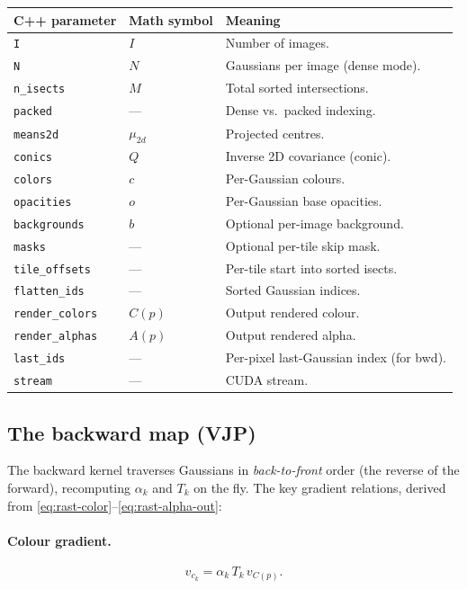 \documentclass[11pt]{article}
\begin{document}
\begin{center}
\begin{tabular}{l l p{7.5cm}}
\hline
\textbf{C++ parameter} & \textbf{Math symbol} & \textbf{Meaning} \\
\hline
\texttt{I} & $I$ & Number of images. \\
\texttt{N} & $N$ & Gaussians per image (dense mode). \\
\texttt{n\_isects} & $M$ & Total sorted intersections. \\
\texttt{packed} & --- & Dense vs.\ packed indexing. \\
\texttt{means2d} & $\mu_{2d}$ & Projected centres. \\
\texttt{conics} & $Q$ & Inverse 2D covariance (conic). \\
\texttt{colors} & $c$ & Per-Gaussian colours. \\
\texttt{opacities} & $o$ & Per-Gaussian base opacities. \\
\texttt{backgrounds} & $b$ & Optional per-image background. \\
\texttt{masks} & --- & Optional per-tile skip mask. \\
\texttt{tile\_offsets} & --- & Per-tile start into sorted isects. \\
\texttt{flatten\_ids} & --- & Sorted Gaussian indices. \\
\texttt{render\_colors} & $C(p)$ & Output rendered colour. \\
\texttt{render\_alphas} & $A(p)$ & Output rendered alpha. \\
\texttt{last\_ids} & --- & Per-pixel last-Gaussian index (for bwd). \\
\texttt{stream} & --- & CUDA stream. \\
\hline
\end{tabular}
\end{center}

\subsection{The backward map (VJP)}

The backward kernel traverses Gaussians in \emph{back-to-front} order
(the reverse of the forward), recomputing $\alpha_k$ and $T_k$ on
the fly. The key gradient relations, derived from
\eqref{eq:rast-color}--\eqref{eq:rast-alpha-out}:

\paragraph{Colour gradient.}
\begin{equation}
  v_{c_k} = \alpha_k\, T_k\, v_{C(p)}.
  \label{eq:rast-bwd-color}
\end{equation}
\end{document}
